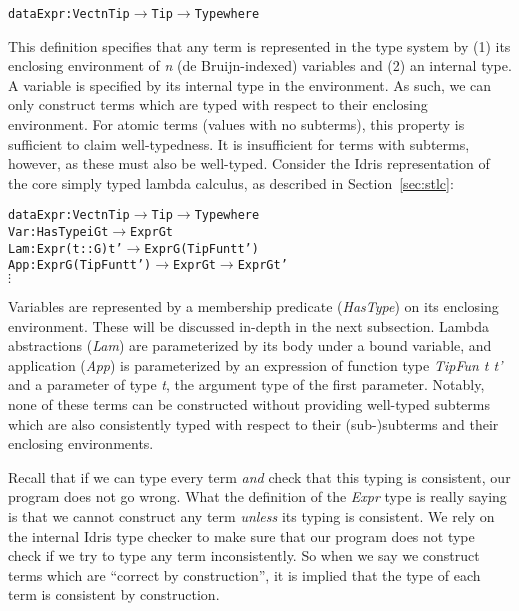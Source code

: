 \begin{alltt}
  data Expr : Vect n Tip \(\rightarrow\) Tip \(\rightarrow\) Type where
\end{alltt}

This definition specifies that any term is represented in the type system by (1) its enclosing environment of \textit{n} (de Bruijn-indexed) variables and (2) an internal type. A variable is specified by its internal type in the environment. As such, we can only construct terms which are typed with respect to their enclosing environment. For atomic terms (values with no subterms), this property is sufficient to claim well-typedness. It is insufficient for terms with subterms, however, as these must also be well-typed. Consider the Idris representation of the core simply typed lambda calculus, as described in Section~\ref{sec:stlc}:

\begin{alltt}
  data Expr : Vect n Tip \(\rightarrow\) Tip \(\rightarrow\) Type where
    Var : HasType i G t \(\rightarrow\) Expr G t
    Lam : Expr (t :: G) t' \(\rightarrow\) Expr G (TipFun t t')
    App : Expr G (TipFun t t') \(\rightarrow\) Expr G t \(\rightarrow\) Expr G t'
    \(\vdots\)  
\end{alltt}

Variables are represented by a membership predicate (\textit{HasType}) on its enclosing environment. These will be discussed in-depth in the next subsection. Lambda abstractions (\textit{Lam}) are parameterized by its body under a bound variable, and application (\textit{App}) is parameterized by an expression of function type \textit{TipFun t t'} and a parameter of type \textit{t}, the argument type of the first parameter. Notably, none of these terms can be constructed without providing well-typed subterms which are also consistently typed with respect to their (sub-)subterms and their enclosing environments.

Recall that if we can type every term \emph{and} check that this typing is consistent, our program does not go wrong. What the definition of the \textit{Expr} type is really saying is that we cannot construct any term \emph{unless} its typing is consistent. We rely on the internal Idris type checker to make sure that our program does not type check if we try to type any term inconsistently. So when we say we construct terms which are ``correct by construction'', it is implied that the type of each term is consistent by construction.
 

